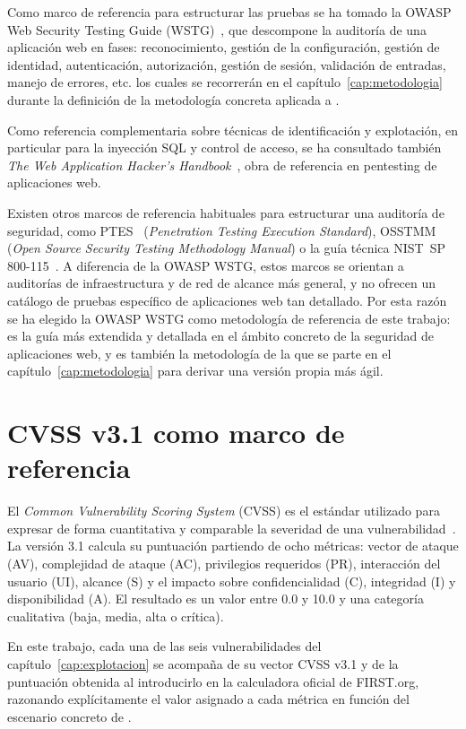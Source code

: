 Como marco de referencia para estructurar las pruebas se ha tomado la OWASP
Web Security Testing Guide (WSTG)~, que descompone la auditoría de una
aplicación web en fases: reconocimiento, gestión de la configuración, gestión
de identidad, autenticación, autorización, gestión de sesión, validación de
entradas, manejo de errores, etc. los cuales se recorrerán en el
capítulo~\ref{cap:metodologia} durante la definición de la metodología concreta aplicada a
\breachlab.

Como referencia complementaria sobre técnicas de identificación y
explotación, en particular para la inyección SQL y control de acceso, se
ha consultado también \emph{The Web Application Hacker's
Handbook}~, obra de referencia en pentesting de aplicaciones
web.

Existen otros marcos de referencia habituales para estructurar una
auditoría de seguridad, como PTES~ (\emph{Penetration
Testing Execution Standard}), OSSTMM~ (\emph{Open Source
Security Testing Methodology Manual}) o la guía técnica NIST~SP
800-115~. A diferencia de la OWASP WSTG, estos
marcos se orientan a auditorías de infraestructura y de red de alcance más
general, y no ofrecen un catálogo de pruebas específico de aplicaciones web
tan detallado. Por esta razón se ha elegido la OWASP WSTG como metodología
de referencia de este trabajo: es la guía más extendida y detallada en el
ámbito concreto de la seguridad de aplicaciones web, y es también la
metodología de la que se parte en el capítulo~\ref{cap:metodologia} para
derivar una versión propia más ágil.

\section{CVSS v3.1 como marco de referencia}
\label{sec:cvss}

El \emph{Common Vulnerability Scoring System} (CVSS) es el estándar utilizado para expresar de forma cuantitativa y
comparable la severidad de una vulnerabilidad~. La versión
3.1 calcula su
puntuación partiendo de ocho métricas: vector de ataque (AV), complejidad
de ataque (AC), privilegios requeridos (PR), interacción del usuario (UI),
alcance (S) y el impacto sobre confidencialidad (C), integridad (I) y
disponibilidad (A). El resultado es un valor entre 0.0 y 10.0 y una categoría
cualitativa (baja, media, alta o crítica).

En este trabajo, cada una de las seis vulnerabilidades del
capítulo~\ref{cap:explotacion} se acompaña de su vector CVSS v3.1 y de la puntuación obtenida al introducirlo
en la calculadora oficial de FIRST.org, razonando explícitamente el valor
asignado a cada métrica en función del escenario concreto de \breachlab.

